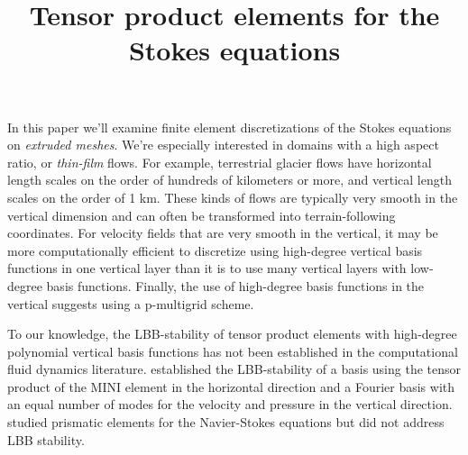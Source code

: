 \documentclass{article}
\title{Tensor product elements for the Stokes equations}
\author{}
\date{}
\theoremstyle{definition}
\theoremstyle{plain}
\begin{document}
\maketitle

In this paper we'll examine finite element discretizations of the Stokes equations on \emph{extruded meshes}.
We're especially interested in domains with a high aspect ratio, or \emph{thin-film} flows.
For example, terrestrial glacier flows have horizontal length scales on the order of hundreds of kilometers or more, and vertical length scales on the order of 1 km.
These kinds of flows are typically very smooth in the vertical dimension and can often be transformed into terrain-following coordinates.
For velocity fields that are very smooth in the vertical, it may be more computationally efficient to discretize using high-degree vertical basis functions in one vertical layer than it is to use many vertical layers with low-degree basis functions.
Finally, the use of high-degree basis functions in the vertical suggests using a p-multigrid scheme.

To our knowledge, the LBB-stability of tensor product elements with high-degree polynomial vertical basis functions has not been established in the computational fluid dynamics literature.
\citet{canuto1984combined} established the LBB-stability of a basis using the tensor product of the MINI element in the horizontal direction and a Fourier basis with an equal number of modes for the velocity and pressure in the vertical direction.
\citet{nakahashi1989finite} studied prismatic elements for the Navier-Stokes equations but did not address LBB stability.
\end{document}
